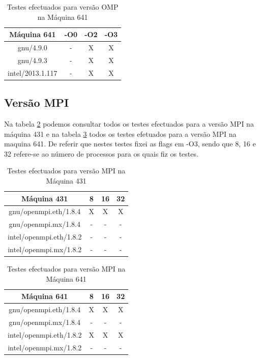 \documentclass[conference,compsoc]{IEEEtran}
\begin{document}
\begin{table}[h!]
\begin{center}
\begin{tabular}{|c|c|c|c|}
\hline
Máquina 641 & -O0 & -O2 & -O3 \\
\hline
gnu/4.9.0 & - & X & X \\
\hline
gnu/4.9.3 & - & X & X \\
\hline
intel/2013.1.117 & - & X & X \\
\hline
\end{tabular}
\end{center}
\caption{Testes efectuados para versão OMP na Máquina 641}
\label{t:testes_omp_641}
\end{table}

\subsection{Versão MPI}
Na tabela \ref{t:testes_mpi_431} podemos consultar todos os testes efectuados para a versão MPI na máquina 431 e na tabela \ref{t:testes_mpi_641} todos os testes efetuados para a versão MPI na maquina 641. De referir que nestes testes fixei as flags em -O3, sendo que 8, 16 e 32 refere-se ao número de processos para os quais fiz os testes.
\begin{table}[h!]
\begin{center}
\begin{tabular}{|c|c|c|c|}
\hline
Máquina 431 & 8 & 16 & 32 \\
\hline
gnu/openmpi.eth/1.8.4 & X & X & X \\
\hline
gnu/openmpi.mx/1.8.4 & - & - & - \\
\hline
intel/openmpi.eth/1.8.2 & - & - & - \\
\hline
intel/openmpi.mx/1.8.2 & - & - & - \\
\hline
\end{tabular}
\end{center}
\caption{Testes efectuados para versão MPI na Máquina 431}
\label{t:testes_mpi_431}
\end{table}%

\begin{table}[h!]
\begin{center}
\begin{tabular}{|c|c|c|c|}
\hline
Máquina 641 & 8 & 16 & 32 \\
\hline
gnu/openmpi.eth/1.8.4 & X & X & X \\
\hline
gnu/openmpi.mx/1.8.4 & - & - & - \\
\hline
intel/openmpi.eth/1.8.2 & X & X & X \\
\hline
intel/openmpi.mx/1.8.2 & - & - & - \\
\hline
\end{tabular}
\end{center}
\caption{Testes efectuados para versão MPI na Máquina 641}
\label{t:testes_mpi_641}
\end{table}%
\end{document}
